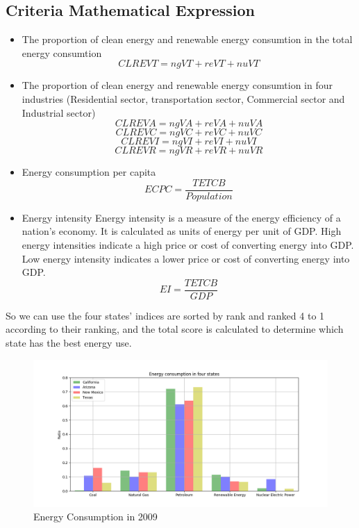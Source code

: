 \documentclass{mcmthesis}
\begin{document}
\subsection{Criteria Mathematical Expression}
\begin{itemize}
  \item The proportion of clean energy and renewable energy consumtion in the total energy consumtion
        $$ CLREVT = ngVT + reVT + nuVT $$
  \item The proportion of clean energy and renewable energy consumtion in four industries (Residential sector, transportation sector, Commercial sector and Industrial sector)
        $$ CLREVA = ngVA + reVA + nuVA$$
        $$ CLREVC = ngVC + reVC + nuVC$$
        $$ CLREVI = ngVI + reVI + nuVI$$
        $$ CLREVR = ngVR + reVR + nuVR$$
  \item Energy consumption per capita
        $$ ECPC = \frac{TETCB}{Population}$$
  \item Energy intensity
        Energy intensity\cite{5} is a measure of the energy efficiency of a nation's economy. It is calculated as units of energy per unit of GDP.
        High energy intensities indicate a high price or cost of converting energy into GDP.
        Low energy intensity indicates a lower price or cost of converting energy into GDP.
        $$ EI = \frac{TETCB}{GDP} $$
\end{itemize}
So we can use the four states' indices are sorted by rank and ranked 4 to 1 according to their ranking, and the total score is calculated to determine which state has the best energy use.
\begin{figure} [h]
\large
\centering
\includegraphics[width=12cm]{energy_2009.png}
\caption{Energy Consumption in 2009} \label{fig:b}
\end{figure}
\end{document}

